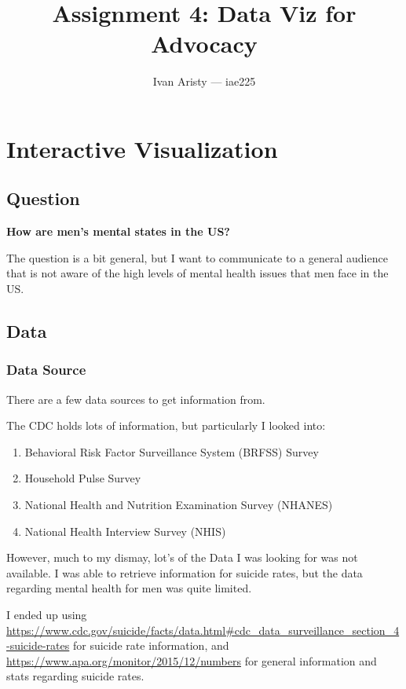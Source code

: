 \documentclass{article}
\title{Assignment 4: Data Viz for Advocacy}
\author{Ivan Aristy — iae225}
\begin{document}
  \maketitle %
  \thispagestyle{empty}

\section{Interactive Visualization}

\subsection{Question}
\label{subsec:subsec1}

\textbf{How are men's mental states in the US?}

The question is a bit general, but I want to communicate to a general audience
that is not aware of the high levels of mental health issues that men face in the US.

\subsection{Data}
\label{subsec:subsec2}

\subsubsection{Data Source}
\label{subsubsec:Data Source}

There are a few data sources to get information from.

The CDC holds lots of information, but particularly I looked into:

\begin{enumerate}
  \item Behavioral Risk Factor Surveillance System (BRFSS) Survey
  \item Household Pulse Survey
  \item National Health and Nutrition Examination Survey (NHANES)
  \item National Health Interview Survey (NHIS)
\end{enumerate}

However, much to my dismay, lot's of the Data I was looking for 
was not available. I was able to retrieve information for suicide rates,
but the data regarding mental health for men was quite limited.

I ended up using \url{https://www.cdc.gov/suicide/facts/data.html#cdc_data_surveillance_section_4-suicide-rates}
for suicide rate information, and \url{https://www.apa.org/monitor/2015/12/numbers}
for general information and stats regarding suicide rates.
\end{document}
